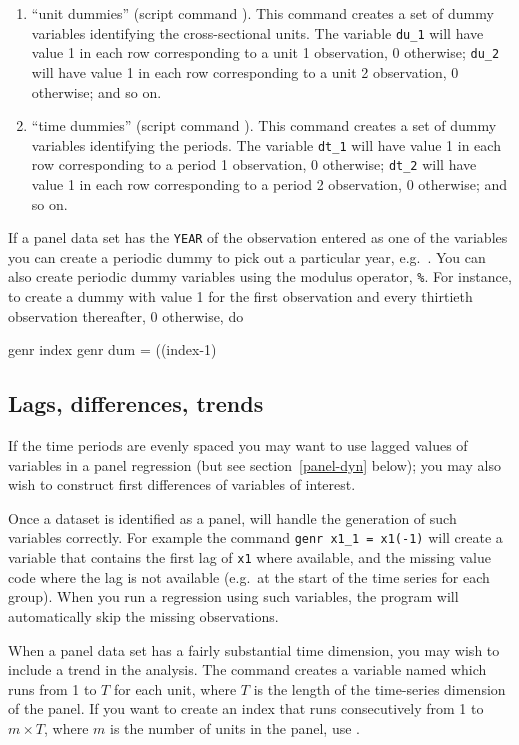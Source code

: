\begin{enumerate}
\item ``unit dummies'' (script command ).  This
  command creates a set of dummy variables identifying the
  cross-sectional units.  The variable \verb+du_1+ will have value 1
  in each row corresponding to a unit 1 observation, 0 otherwise;
  \verb+du_2+ will have value 1 in each row corresponding to a unit 2
  observation, 0 otherwise; and so on.
\item ``time dummies'' (script command ).  This
  command creates a set of dummy variables identifying the periods.
  The variable \verb+dt_1+ will have value 1 in each row
  corresponding to a period 1 observation, 0 otherwise; \verb+dt_2+
  will have value 1 in each row corresponding to a period 2
  observation, 0 otherwise; and so on.
\end{enumerate}

If a panel data set has the \verb+YEAR+ of the observation entered as
one of the variables you can create a periodic dummy to pick out a
particular year, e.g.\ .  You can also
create periodic dummy variables using the modulus operator,
\verb+%+.  For instance, to create a dummy with
value 1 for the first observation and every thirtieth observation
thereafter, 0 otherwise, do
\begin{code}
      genr index 
      genr dum = ((index-1)%
\end{code}

\subsection{Lags, differences, trends}
\label{panel-lagged}

If the time periods are evenly spaced you may want to use lagged
values of variables in a panel regression (but see
section~\ref{panel-dyn} below); you may also wish to construct first
differences of variables of interest.

Once a dataset is identified as a panel,  will handle the
generation of such variables correctly.  For example the command
\verb+genr x1_1 = x1(-1)+ will create a variable that contains the
first lag of \verb+x1+ where available, and the missing value code
where the lag is not available (e.g.\ at the start of the time series
for each group).  When you run a regression using such variables, the
program will automatically skip the missing observations.

When a panel data set has a fairly substantial time dimension, you may
wish to include a trend in the analysis.  The command  
creates a variable named  which runs from 1 to $T$ for
each unit, where $T$ is the length of the time-series dimension of the
panel.  If you want to create an index that runs consecutively from 1
to $m\times T$, where $m$ is the number of units in the panel, use
.

